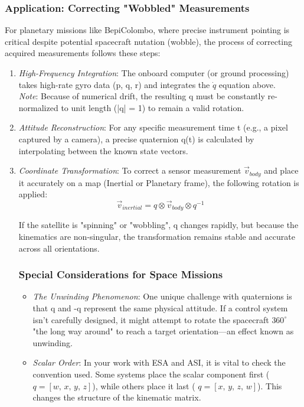 \documentclass[a4paper,10pt]{article}
\begin{document}
\subsubsection{Application: Correcting "Wobbled" Measurements}
For planetary missions like BepiColombo, where precise instrument pointing is critical despite potential spacecraft nutation (wobble), the process of correcting acquired measurements follows these steps:
\begin{enumerate}
\item \emph{High-Frequency Integration}: The onboard computer (or ground processing) takes high-rate gyro data (p, q, r) and integrates the \( \dot{q} \) equation above.\\
\textit{Note}: Because of numerical drift, the resulting q must be constantly re-normalized to unit length (|q| = 1) to remain a valid rotation.
\item \emph{Attitude Reconstruction}: For any specific measurement time t (e.g., a pixel captured by a camera), a precise quaternion q(t) is calculated by interpolating between the known state vectors.
\item \emph{Coordinate Transformation}: To correct a sensor measurement \( \vec{v}_{body}\) and place it accurately on a map (Inertial or Planetary frame), the following rotation is applied:
\[
\vec{v}_{inertial} = q \otimes \vec{v}_{body} \otimes q^{-1}
\]

If the satellite is "spinning" or "wobbling", q changes rapidly, but because the kinematics are non-singular, the transformation remains stable and accurate across all orientations.
\subsubsection{Special Considerations for Space Missions}
\begin{itemize}
\item \emph{The Unwinding Phenomenon}: One unique challenge with quaternions is that q and -q represent the same physical attitude. If a control system isn't carefully designed, it might attempt to rotate the spacecraft \(360^{\circ}\) "the long way around" to reach a target orientation—an effect known as unwinding.
\item \emph{Scalar Order}: In your work with ESA and ASI, it is vital to check the convention used. Some systems place the scalar component first (\( q = [ w,\,x,\,y,\,z] \)), while others place it last ( \( q = [x,\,y,\,z,\,w] \)). This changes the structure of the kinematic matrix.
\end{itemize}
\end{enumerate}
\end{document}
